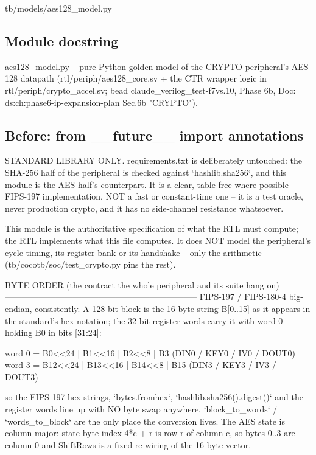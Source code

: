 \begin{relocated}{tb/models/aes128_model.py}

\subsection*{Module docstring}

\begin{textblock}
aes128_model.py -- pure-Python golden model of the CRYPTO peripheral's AES-128 datapath
(rtl/periph/aes128_core.sv + the CTR wrapper logic in rtl/periph/crypto_accel.sv; bead
claude_verilog_test-f7vs.10, Phase 6b, Doc: ds:ch:phase6-ip-expansion-plan Sec.6b "CRYPTO").
\end{textblock}

\subsection*{Before: from \_\_future\_\_ import annotations}

\begin{textblock}
STANDARD LIBRARY ONLY. requirements.txt is deliberately untouched: the SHA-256 half of the
peripheral is checked against `hashlib.sha256`, and this module is the AES half's counterpart. It
is a clear, table-free-where-possible FIPS-197 implementation, NOT a fast or constant-time one --
it is a test oracle, never production crypto, and it has no side-channel resistance whatsoever.

This module is the authoritative specification of what the RTL must compute; the RTL implements
what this file computes. It does NOT model the peripheral's cycle timing, its register bank or its
handshake -- only the arithmetic (tb/cocotb/soc/test_crypto.py pins the rest).

BYTE ORDER (the contract the whole peripheral and its suite hang on)
--------------------------------------------------------------------
FIPS-197 / FIPS-180-4 big-endian, consistently. A 128-bit block is the 16-byte string B[0..15] as
it appears in the standard's hex notation; the 32-bit register words carry it with word 0 holding
B0 in bits [31:24]:

word 0 = B0<<24 | B1<<16 | B2<<8 | B3      (DIN0 / KEY0 / IV0 / DOUT0)
word 3 = B12<<24 | B13<<16 | B14<<8 | B15  (DIN3 / KEY3 / IV3 / DOUT3)

so the FIPS-197 hex strings, `bytes.fromhex`, `hashlib.sha256().digest()` and the register words
line up with NO byte swap anywhere. `block_to_words` / `words_to_block` are the only place the
conversion lives. The AES state is column-major: state byte index 4*c + r is row r of column c,
so bytes 0..3 are column 0 and ShiftRows is a fixed re-wiring of the 16-byte vector.


\end{textblock}
\end{relocated}
